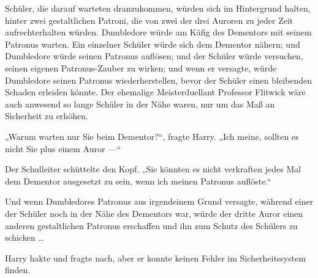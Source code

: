 Schüler, die darauf warteten dranzukommen, würden sich im Hintergrund halten, hinter zwei gestaltlichen Patroni, die von zwei der drei Auroren zu jeder Zeit aufrechterhalten würden. Dumbledore würde am Käfig des Dementors mit seinem Patronus warten. Ein einzelner Schüler würde sich dem Dementor nähern; und Dumbledore würde seinen Patronus auflösen; und der Schüler würde versuchen, seinen eigenen Patronus-Zauber zu wirken; und wenn er versagte, würde Dumbledore seinen Patronus wiederherstellen, bevor der Schüler einen bleibenden Schaden erleiden könnte. Der ehemalige Meisterduellant Professor Flitwick wäre auch anwesend so lange Schüler in der Nähe waren, nur um das Maß an Sicherheit zu erhöhen.

„Warum warten nur Sie beim Dementor?“, fragte Harry.
„Ich meine, sollten es nicht Sie plus einem Auror —“

Der Schulleiter schüttelte den Kopf.
„Sie könnten es nicht verkraften jedes Mal dem Dementor ausgesetzt zu sein, wenn ich meinen Patronus auflöste.“

Und wenn Dumbledores Patronus aus irgendeinem Grund versagte, während einer der Schüler noch in der Nähe des Dementors war, würde der dritte Auror einen anderen gestaltlichen Patronus erschaffen und ihn zum Schutz des Schülers zu schicken …

Harry hakte und fragte nach, aber er konnte keinen Fehler im Sicherheitssystem finden.

